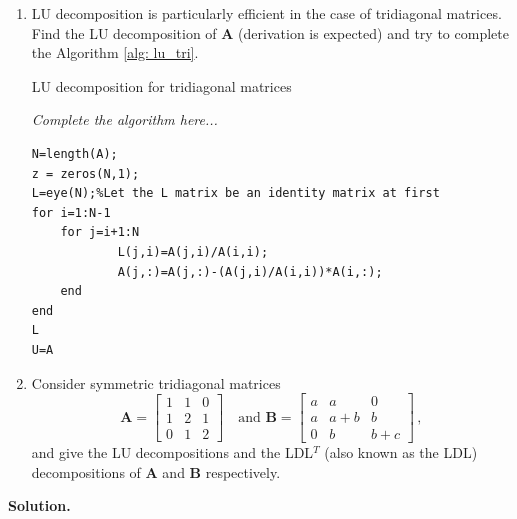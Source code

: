 \documentclass[english,onecolumn]{IEEEtran}
\begin{document}
\begin{enumerate}
	\item LU decomposition is particularly efficient in the case of tridiagonal matrices. Find the LU decomposition of $\mathbf{A}$ (derivation is expected) and try to complete the Algorithm \ref{alg: lu_tri}.
\begin{algorithm}[htbp]
\label{alg: lu_tri}
\caption{LU decomposition for tridiagonal matrices}
\SetAlgoLined
{}
\textit{Complete the algorithm here...}

\begin{lstlisting}
N=length(A);
z = zeros(N,1);
L=eye(N);%Let the L matrix be an identity matrix at first
for i=1:N-1
    for j=i+1:N            
            L(j,i)=A(j,i)/A(i,i);
            A(j,:)=A(j,:)-(A(j,i)/A(i,i))*A(i,:);
    end
end
L
U=A
\end{lstlisting}



\end{algorithm}
\item
Consider symmetric tridiagonal matrices
\[
\mathbf{A} = \begin{bmatrix}
    1 & 1 & 0\\
    1 & 2 & 1 \\
    0 & 1 & 2 
\end{bmatrix}
\quad \text{and  }
\mathbf{B}= \begin{bmatrix}
    a & a & 0 \\
    a & a+b & b \\
    0 & b & b+c
\end{bmatrix}\,,
\]
and give the LU decompositions and the LDL$^T$ (also known as the LDL) decompositions of $\mathbf{A}$ and $\mathbf{B}$ respectively.
\end{enumerate}
\noindent\textbf{Solution.}
\end{document}
